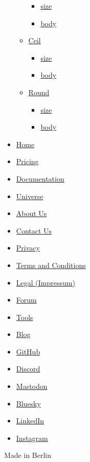 \begin{itemize}
\begin{itemize}
    \begin{itemize}
    \tightlist
    \item
      \hyperref[functions-floor-size]{size}
    \item
      \hyperref[functions-floor-body]{body}
    \end{itemize}
  \item
    \hyperref[functions-ceil]{Ceil}

    \begin{itemize}
    \tightlist
    \item
      \hyperref[functions-ceil-size]{size}
    \item
      \hyperref[functions-ceil-body]{body}
    \end{itemize}
  \item
    \hyperref[functions-round]{Round}

    \begin{itemize}
    \tightlist
    \item
      \hyperref[functions-round-size]{size}
    \item
      \hyperref[functions-round-body]{body}
    \end{itemize}
  \end{itemize}
\end{itemize}

\begin{itemize}
\tightlist
\item
  \href{/}{Home}
\item
  \href{/pricing/}{Pricing}
\item
  \href{/docs/}{Documentation}
\item
  \href{/universe/}{Universe}
\item
  \href{/about/}{About Us}
\item
  \href{/contact/}{Contact Us}
\item
  \href{/privacy/}{Privacy}
\item
  \href{https://typst.app/terms}{Terms and Conditions}
\item
  \href{/legal/}{Legal (Impressum)}
\end{itemize}

\begin{itemize}
\tightlist
\item
  \href{https://forum.typst.app}{Forum}
\item
  \href{/tools/}{Tools}
\item
  \href{/blog/}{Blog}
\item
  \href{https://github.com/typst/}{GitHub}
\item
  \href{https://discord.gg/2uDybryKPe}{Discord}
\item
  \href{https://mastodon.social/@typst}{Mastodon}
\item
  \href{https://bsky.app/profile/typst.app}{Bluesky}
\item
  \href{https://www.linkedin.com/company/typst/}{LinkedIn}
\item
  \href{https://instagram.com/typstapp/}{Instagram}
\end{itemize}

Made in Berlin

